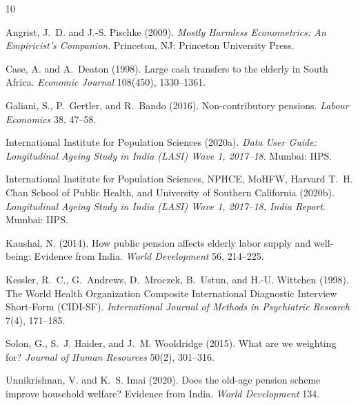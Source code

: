 \documentclass[11pt]{article}
\begin{document}
\begin{thebibliography}{10}

Angrist, J.~D. and J.-S. Pischke (2009).
\newblock \emph{Mostly Harmless Econometrics: An Empiricist's Companion}.
\newblock Princeton, NJ: Princeton University Press.

Case, A. and A.~Deaton (1998).
\newblock Large cash transfers to the elderly in {South Africa}.
\newblock \emph{Economic Journal} 108(450), 1330--1361.

Galiani, S., P.~Gertler, and R.~Bando (2016).
\newblock Non-contributory pensions.
\newblock \emph{Labour Economics} 38, 47--58.

International Institute for Population Sciences (2020a).
\newblock \emph{Data User Guide: Longitudinal Ageing Study in India (LASI)
Wave 1, 2017--18}.
\newblock Mumbai: IIPS.

International Institute for Population Sciences, NPHCE, MoHFW, Harvard T.~H.
Chan School of Public Health, and University of Southern California (2020b).
\newblock \emph{Longitudinal Ageing Study in India (LASI) Wave 1, 2017--18,
India Report}.
\newblock Mumbai: IIPS.

Kaushal, N. (2014).
\newblock How public pension affects elderly labor supply and well-being:
Evidence from {India}.
\newblock \emph{World Development} 56, 214--225.

Kessler, R.~C., G.~Andrews, D.~Mroczek, B.~Ustun, and H.-U. Wittchen (1998).
\newblock The {World Health Organization Composite International Diagnostic
Interview} Short-Form ({CIDI-SF}).
\newblock \emph{International Journal of Methods in Psychiatric Research}
7(4), 171--185.

Solon, G., S.~J. Haider, and J.~M. Wooldridge (2015).
\newblock What are we weighting for?
\newblock \emph{Journal of Human Resources} 50(2), 301--316.

Unnikrishnan, V. and K.~S. Imai (2020).
\newblock Does the old-age pension scheme improve household welfare?
{Evidence} from {India}.
\newblock \emph{World Development} 134.

\end{thebibliography}
\end{document}
